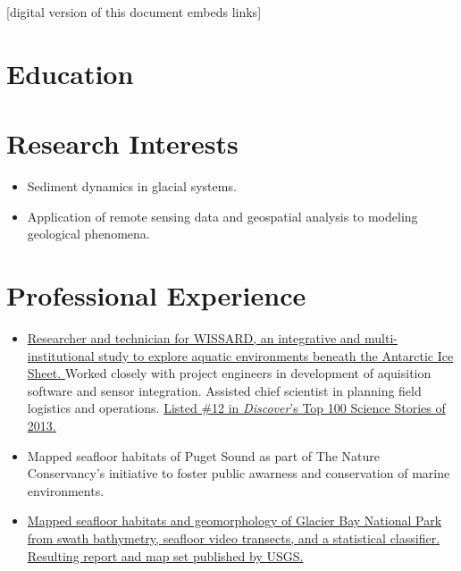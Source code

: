 \documentclass{cv_TOH}
\begin{document}
\vspace{-0.2cm}
\centerline{\footnotesize{[digital version of this document embeds links]}}

\section{Education}

\section{Research Interests}
\begin{itemize}
\item Sediment dynamics in glacial systems.
\item Application of remote sensing data and geospatial analysis to modeling geological phenomena.
\end{itemize}

\section{Professional Experience}

\begin{itemize}
\item \href{http://www.wissard.org}{Researcher and technician for WISSARD, an integrative and multi-institutional study to explore aquatic environments beneath the Antarctic Ice Sheet. }Worked closely with project engineers in development of aquisition software and sensor integration. Assisted chief scientist in planning field logistics and operations. \href{http://discovermagazine.com/2014/jan-feb/12-the-search-for-life-trapped-under-ice}{Listed \#12 in \textit{Discover}'s Top 100 Science Stories of 2013.}
\item Mapped seafloor habitats of Puget Sound as part of The Nature Conservancy's initiative to foster public awarness and conservation of marine environments.
\item \href{http://pubs.usgs.gov/sim/3253/}{Mapped seafloor habitats and geomorphology of Glacier Bay National Park from swath bathymetry, seafloor video transects, and a statistical classifier. Resulting report and map set published by USGS.}
\end{itemize}
\end{document}
